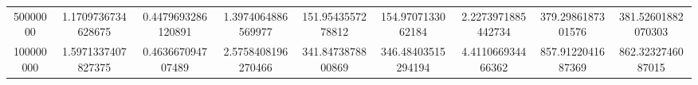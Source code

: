 \begin{table}[ht]
\begin{tabular}{@{}SSSSSSSSS@{}}
        50000000 & 1.1709736734628675 & 0.4479693286120891 & 1.3974064886569977 & 151.9543557278812 & 154.9707133062184 & 2.2273971885442734 & 379.2986187301576 & 381.52601882070303 \\
        100000000 & 1.5971337407827375 & 0.463667094707489 & 2.5758408196270466 & 341.8473878800869 & 346.48403515294194 & 4.411066934466362 & 857.9122041687369 & 862.3232746087015 \\
        \bottomrule
    \end{tabular}\label{table:efficiency_parquet-60percent_small-tables}
\end{table}
